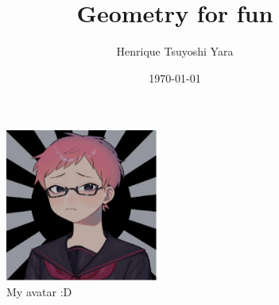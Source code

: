 \documentclass[10pt]{article}
\begin{document}
	\begin{titlepage}

        \title{Geometry for fun}
        \author{Henrique Tsuyoshi Yara}
        \date{\today}

        \null  %
        \nointerlineskip  %
        \vfill
        \let\snewpage \newpage
        \let\newpage \relax

        \maketitle

        \vspace{1in}
        \begin{figure}
            \centering
            \includegraphics[width=5cm]{my_avatar}
            \caption{My avatar :D}
        \end{figure}

        \thispagestyle{empty}
        \let \newpage \snewpage
        \vfill
        \break %

    \end{titlepage}

    \tableofcontents

    
    
    
\end{document}
